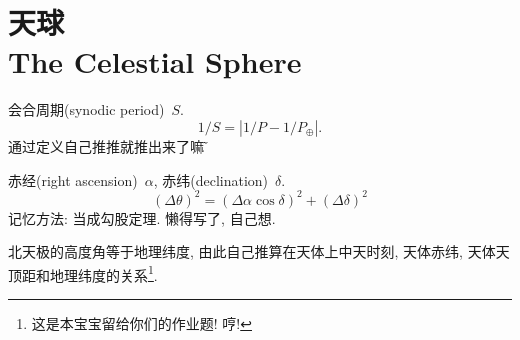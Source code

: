 \chapter{天球\\The Celestial Sphere}

会合周期(synodic period)~$S$.
\begin{equation*}
    1/S = \left\lvert 1/P - 1/P_\oplus \right\rvert.
\end{equation*}
通过定义自己推推就推出来了嘛$\!\text{\~{}}$

赤经(right ascension)~$\alpha$, 赤纬(declination)~$\delta$.
\begin{equation*}
    (\Delta\theta)^2 = (\Delta\alpha\cos\delta)^2+(\Delta\delta)^2
\end{equation*}
记忆方法: 当成勾股定理. 懒得写了, 自己想.

北天极的高度角等于地理纬度, 由此自己推算在天体上中天时刻, 天体赤纬, 天体天顶距和地理纬度的关系\footnote{这是本宝宝留给你们的作业题! 哼!}.
